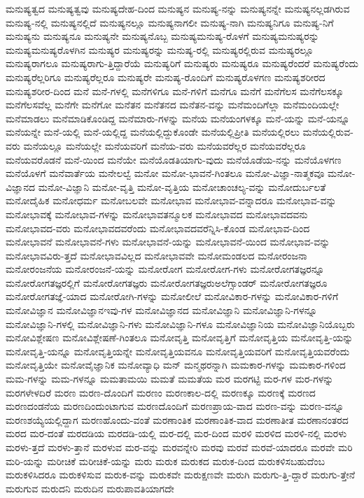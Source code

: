 {ಮನುಷ್ಯತ್ವದ
ಮನುಷ್ಯತ್ವವು
ಮನುಷ್ಯದೇಹ-ದಿಂದ
ಮನುಷ್ಯನ
ಮನುಷ್ಯ-ನನ್ನು
ಮನುಷ್ಯನನ್ನೇ
ಮನುಷ್ಯನಲ್ಲಡಗಿರುವ
ಮನುಷ್ಯ-ನಲ್ಲಿ
ಮನುಷ್ಯನಲ್ಲಿದೆ
ಮನುಷ್ಯನಲ್ಲೂ
ಮನುಷ್ಯನಾಗಲೀ
ಮನುಷ್ಯ-ನಾಗಿ
ಮನುಷ್ಯನಿಗೂ
ಮನುಷ್ಯ-ನಿಗೆ
ಮನುಷ್ಯನು
ಮನುಷ್ಯನೂ
ಮನುಷ್ಯನೇ
ಮನುಷ್ಯನೊಬ್ಬ
ಮನುಷ್ಯಮನುಷ್ಯ-ರೊಳಗೆ
ಮನುಷ್ಯಮನುಷ್ಯರನ್ನು
ಮನುಷ್ಯಮನುಷ್ಯರೊಳಗಿನ
ಮನುಷ್ಯರ
ಮನುಷ್ಯರನ್ನು
ಮನುಷ್ಯ-ರಲ್ಲಿ
ಮನುಷ್ಯರಲ್ಲಿರುವ
ಮನುಷ್ಯರಲ್ಲೂ
ಮನುಷ್ಯರಾಗಲೂ
ಮನುಷ್ಯರಾಗು-ತ್ತಿದ್ದಾರೆಯೆ
ಮನುಷ್ಯರಿಗೆ
ಮನುಷ್ಯರು
ಮನುಷ್ಯರೂ
ಮನುಷ್ಯರೆಂದರೆ
ಮನುಷ್ಯರೆಂದು
ಮನುಷ್ಯರೆಲ್ಲರಿಗೂ
ಮನುಷ್ಯರೆಲ್ಲರೂ
ಮನುಷ್ಯರೇ
ಮನುಷ್ಯ-ರೊಂದಿಗೆ
ಮನುಷ್ಯರೊಳಗಣ
ಮನುಷ್ಯಶರೀರದ
ಮನುಷ್ಯಶರೀರ-ದಿಂದ
ಮನೆ
ಮನೆ-ಗಳಲ್ಲಿ
ಮನೆಗಳಿಗೂ
ಮನೆ-ಗಳಿಗೆ
ಮನೆಗೂ
ಮನೆಗೆ
ಮನೆಗೆಲಸ
ಮನೆಗೆಲಸಕ್ಕೂ
ಮನೆಗೆಲಸವೆಲ್ಲ
ಮನೆಗೇ
ಮನೆಗೋ
ಮನೆತನ
ಮನೆತನದ
ಮನೆತನ-ವನ್ನು
ಮನೆಮಂದಿಗೆಲ್ಲಾ
ಮನೆಮಂದಿಯಲ್ಲೇ
ಮನೆಮಾಡಲು
ಮನೆಮಾಡಿಕೊಂಡಿದ್ದ
ಮನೆಮಾರು-ಗಳನ್ನು
ಮನೆಯ
ಮನೆಯಂಗಳಕ್ಕೂ
ಮನೆ-ಯನ್ನು
ಮನೆ-ಯನ್ನೂ
ಮನೆಯನ್ನೇ
ಮನೆ-ಯಲ್ಲಿ
ಮನೆ-ಯಲ್ಲಿದ್ದ
ಮನೆಯಲ್ಲಿದ್ದುಕೊಂಡೇ
ಮನೆಯಲ್ಲಿಪ್ರೀತಿ
ಮನೆಯಲ್ಲಿರಲು
ಮನೆಯಲ್ಲಿರುವ-ವರು
ಮನೆಯಲ್ಲೂ
ಮನೆಯಲ್ಲೇ
ಮನೆಯವರಿಗೆ
ಮನೆಯ-ವರು
ಮನೆಯವರೆಲ್ಲರ
ಮನೆಯವರೆಲ್ಲರೂ
ಮನೆಯವರೊಡನೆ
ಮನೆ-ಯಿಂದ
ಮನೆಯೇ
ಮನೆಯೊಡತಿಯಾಗು-ವುದು
ಮನೆಯೊಡೆಯ-ನನ್ನು
ಮನೆಯೊಳಗಣ
ಮನೆಯೊಳಗೆ
ಮನೆವಾರ್ತೆಯ
ಮನೇಲಲ್ವೆ
ಮನೋ
ಮನೋ-ಭಾವನೆ-ಗಿಂತಲೂ
ಮನೋ-ವಿಜ್ಞಾ-ನಾತ್ಮಕವೂ
ಮನೋ-ವಿಜ್ಞಾನದ
ಮನೋ-ವಿಜ್ಞಾನಿ
ಮನೋ-ವೃತ್ತಿ
ಮನೋ-ವೃತ್ತಿಯ
ಮನೋಚಾಂಚಲ್ಯ-ವನ್ನು
ಮನೋದುರ್ಬಲತೆ
ಮನೋದೈಹಿಕ
ಮನೋಧರ್ಮ
ಮನೋಬಲವೇ
ಮನೋಭಾವ
ಮನೋಭಾವ-ವನ್ನಾದರೂ
ಮನೋಭಾವ-ವನ್ನು
ಮನೋಭಾವಕ್ಕೆ
ಮನೋಭಾವ-ಗಳನ್ನು
ಮನೋಭಾವತನ್ಮೂಲಕ
ಮನೋಭಾವದ
ಮನೋಭಾವದವನು
ಮನೋಭಾವದ-ವರು
ಮನೋಭಾವದವರೆಂದು
ಮನೋಭಾವದವರೆನ್ನಿಸಿ-ಕೊಂಡ
ಮನೋಭಾವ-ದಿಂದ
ಮನೋಭಾವನೆ
ಮನೋಭಾವನೆ-ಗಳು
ಮನೋಭಾವನೆ-ಯನ್ನು
ಮನೋಭಾವನೆ-ಯಿಂದ
ಮನೋಭಾವ-ವನ್ನು
ಮನೋಭಾವವಿರು-ತ್ತದೆ
ಮನೋಭಾವವಿಲ್ಲದ
ಮನೋಭಾವವೇ
ಮನೋಮಂಡಲದ
ಮನೋರಂಜನಾ
ಮನೋರಂಜನೆಯ
ಮನೋರಂಜನೆ-ಯನ್ನು
ಮನೋರೋಗ
ಮನೋರೋಗ-ಗಳು
ಮನೋರೋಗತಜ್ಞರನ್ನೂ
ಮನೋರೋಗತಜ್ಞರಲ್ಲಿಗೆ
ಮನೋರೋಗತಜ್ಞರು
ಮನೋರೋಗತಜ್ಞರುಅಲೆಗ್ಸಾಂಡರ್
ಮನೋರೋಗತಜ್ಞರೂ
ಮನೋರೋಗತಜ್ಞೆ-ಯಾದ
ಮನೋರೋಗಿ-ಗಳನ್ನು
ಮನೋಲೀಲೆ
ಮನೋವಿಕಾರ-ಗಳನ್ನು
ಮನೋವಿಕಾರ-ಗಳಿಗೆ
ಮನೋವಿಜ್ಞಾನ
ಮನೋವಿಜ್ಞಾನಇವು-ಗಳ
ಮನೋವಿಜ್ಞಾನದ
ಮನೋವಿಜ್ಞಾನಿ
ಮನೋವಿಜ್ಞಾನಿ-ಗಳನ್ನೂ
ಮನೋವಿಜ್ಞಾನಿ-ಗಳಲ್ಲಿ
ಮನೋವಿಜ್ಞಾನಿ-ಗಳು
ಮನೋವಿಜ್ಞಾನಿ-ಗಳೂ
ಮನೋವಿಜ್ಞಾನಿಯ
ಮನೋವಿಜ್ಞಾನಿಯೊಬ್ಬರು
ಮನೋವಿಶ್ಲೇಷಣ
ಮನೋವಿಶ್ಲೇಷಣೆ-ಗಿಂತಲೂ
ಮನೋವೃತ್ತಿ
ಮನೋವೃತ್ತಿಗೆ
ಮನೋವೃತ್ತಿಯ
ಮನೋವೃತ್ತಿ-ಯನ್ನು
ಮನೋವೃತ್ತಿ-ಯನ್ನೂ
ಮನೋವೃತ್ತಿಯನ್ನೇ
ಮನೋವೃತ್ತಿಯವನೂ
ಮನೋವೃತ್ತಿಯವರಿಗೆ
ಮನೋವೃತ್ತಿಯವರೆಂದು
ಮನೋವೃತ್ತಿಯೇ
ಮನೋವೈಜ್ಞಾನಿಕ
ಮನೋವ್ಯಾಧಿ
ಮನ್
ಮನ್ಮಥರನ್ನಾಗಿ
ಮಮಕಾರ-ಗಳನ್ನು
ಮಮಕಾರ-ಗಳಿಂದ
ಮಮ-ಗಳನ್ನು
ಮಮ-ಗಳನ್ನೂ
ಮಮತಾಮಯಿ
ಮಮತೆ
ಮಮತೆಯ
ಮರ
ಮರಗಟ್ಟಿ
ಮರ-ಗಳ
ಮರ-ಗಳನ್ನು
ಮರಗಳೇಳದಿರೆ
ಮರಣ
ಮರಣ-ದೊಂದಿಗೆ
ಮರಣಂ
ಮರಣಕಾಲ-ದಲ್ಲಿ
ಮರಣಕ್ಕೂ
ಮರಣಕ್ಕೆ
ಮರಣದ
ಮರಣದಂಡನೆಯ
ಮರಣದಿಂದುಂಟಾಗುವ
ಮರಣದೊಂದಿಗೆ
ಮರಣಪ್ರಾಯ-ವಾದ
ಮರಣ-ವನ್ನು
ಮರಣ-ವನ್ನೂ
ಮರಣಶಯ್ಯೆಯಲ್ಲಿದ್ದಾಗ
ಮರಣಹೊಂದು-ವಂತೆ
ಮರಣಾಂತಿಕ
ಮರಣಾಂತಿಕ-ವಾದ
ಮರಣಾತೀತ
ಮರಣಾನಂತರದ
ಮರದ
ಮರ-ದಂತೆ
ಮರದಡಿಯ
ಮರದಡಿ-ಯಲ್ಲಿ
ಮರ-ದಲ್ಲಿ
ಮರ-ದಿಂದ
ಮರಳಿ
ಮರಳಿದ
ಮರಳಿ-ನಲ್ಲಿ
ಮರಳು
ಮರಳು-ತ್ತದೆ
ಮರಳು-ತ್ತಾನೆ
ಮರಳುವ
ಮರ-ವನ್ನು
ಮರವನ್ನೇರಿ
ಮರವು
ಮರವೆ
ಮರವೆ-ಯಾದರೂ
ಮರವೇ
ಮರಿ
ಮರಿ-ಯನ್ನು
ಮರೀಚಿಕೆ
ಮರೀಚಿಕೆ-ಯನ್ನು
ಮರು
ಮರುಕ
ಮರುಕದ
ಮರುಕ-ದಿಂದ
ಮರುಕಳಿಸಬಹುದೆಂಬ
ಮರುಕಳಿಸಿದರೂ
ಮರುಕಳಿಸುವ
ಮರುಕ-ವನ್ನು
ಮರುಕವೇ
ಮರುಕ್ಷಣವೇ
ಮರುಗಿ
ಮರುಗು-ತ್ತಿ-ದ್ದಾರೆ
ಮರುಗು-ತ್ತೇನೆ
ಮರುಗುವ
ಮರುದನಿ
ಮರುದಿನ
ಮರುಪಾವತಿಯಾಗದೇ
}
